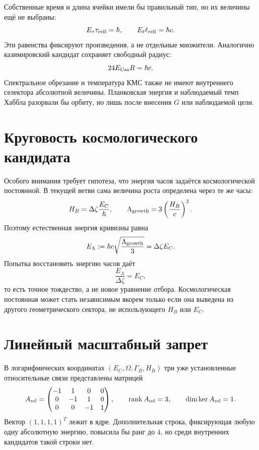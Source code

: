 Собственные время и длина ячейки имели бы правильный тип, но их величины
ещё не выбраны:
\begin{equation}
 E_\tau\tau_{\rm cell}=\hbar,
 \qquad
 E_\ell\ell_{\rm cell}=\hbar c.
 \label{eq:v10-anchor-cell-products}
\end{equation}
Эти равенства фиксируют произведения, а не отдельные множители. Аналогично
казимировский кандидат сохраняет свободный радиус:
\begin{equation}
 24E_{\rm Cas}R=\hbar c.
 \label{eq:v10-anchor-casimir-product}
\end{equation}
Спектральное обрезание и температура КМС также не имеют внутреннего
селектора абсолютной величины. Планковская энергия и наблюдаемый темп
Хаббла разорвали бы орбиту, но лишь после внесения $G$ или наблюдаемой цели.

\section{Круговость космологического кандидата}

Особого внимания требует гипотеза, что энергия часов задаётся
космологической постоянной. В текущей ветви сама величина роста определена
через те же часы:
\begin{equation}
 H_B=\Delta\zeta\frac{E_C}{\hbar},
 \qquad
 \Lambda_{\rm growth}=3\left(\frac{H_B}{c}\right)^2.
 \label{eq:v10-anchor-growth-curvature}
\end{equation}
Поэтому естественная энергия кривизны равна
\begin{equation}
 E_\Lambda
 :=\hbar c\sqrt{\frac{\Lambda_{\rm growth}}3}
 =\Delta\zeta E_C.
 \label{eq:v10-anchor-curvature-energy}
\end{equation}
Попытка восстановить энергию часов даёт
\begin{equation}
 \frac{E_\Lambda}{\Delta\zeta}=E_C,
 \label{eq:v10-anchor-curvature-tautology}
\end{equation}
то есть точное тождество, а не новое уравнение отбора. Космологическая
постоянная может стать независимым якорем только если она выведена из
другого геометрического сектора, не использующего $H_B$ или $E_C$.

\section{Линейный масштабный запрет}

В логарифмических координатах $(E_C,\Omega,\Gamma_B,H_B)$ три уже
установленные относительные связи представлены матрицей
\begin{equation}
 A_{\rm rel}=
 \begin{pmatrix}
 -1&1&0&0\\
 0&-1&1&0\\
 0&0&-1&1
 \end{pmatrix},
 \qquad \operatorname{rank} A_{\rm rel}=3,
 \qquad \dim\ker A_{\rm rel}=1.
 \label{eq:v10-anchor-relative-map}
\end{equation}
Вектор $(1,1,1,1)^T$ лежит в ядре. Дополнительная строка, фиксирующая
любую одну абсолютную энергию, повысила бы ранг до $4$, но среди внутренних
кандидатов такой строки нет.

